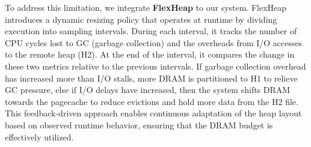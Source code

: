 To address this limitation, we integrate \textbf{FlexHeap} to our system.
FlexHeap introduces a dynamic resizing policy that operates at runtime by dividing execution into 
sampling intervals. During each interval, it tracks the number of CPU cycles lost to GC (garbage collection)
and the overheads from I/O accesses to the remote heap (H2). At the end of the interval, it
compares the change in these two metrics relative to the previous intervals. If garbage collection overhead 
has increased more than I/O stalls, more DRAM is partitioned to H1 to relieve GC pressure, else if I/O 
delays have increased, then the system shifts DRAM towards the pagecache to reduce evictions and hold more data from the H2 file. 
This feedback-driven approach enables continuous adaptation of the heap layout based on observed runtime behavior, 
ensuring that the DRAM budget is effectively utilized. 


